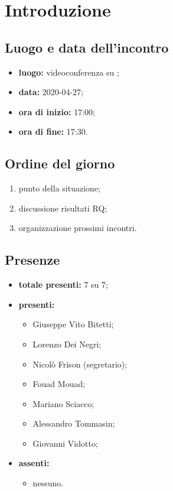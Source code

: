 \section*{Introduzione}

\subsection*{Luogo e data dell'incontro}
	\begin{itemize}
		\item \textbf{luogo:} videoconferenza su ;
		\item \textbf{data:} 2020-04-27;
		\item \textbf{ora di inizio:} 17:00;
		\item \textbf{ora di fine:} 17:30.
	\end{itemize}

\subsection*{Ordine del giorno}
	\begin{enumerate}
			\item punto della situazione;
			\item discussione risultati RQ;
			\item organizzazione prossimi incontri.
	\end{enumerate}

\subsection*{Presenze}
	\begin{itemize}
		\item \textbf{totale presenti:} 7 su 7;
		\item \textbf{presenti: }
			\begin{itemize}
				\item Giuseppe Vito Bitetti;
				\item Lorenzo Dei Negri;
				\item Nicolò Frison (segretario);
				\item Fouad Mouad;
				\item Mariano Sciacco;
				\item Alessandro Tommasin;
				\item Giovanni Vidotto;
			\end{itemize}
		\item \textbf{assenti: }
			\begin{itemize}
				\item nessuno.
			\end{itemize}
	\end{itemize}


